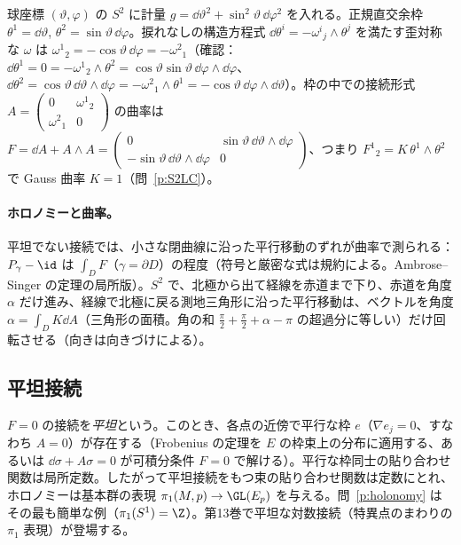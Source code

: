 \begin{ex}\label{ex:S2LC}
球座標 $(\vartheta,\varphi)$ の $S^2$ に計量 $g=\dd\vartheta^2+\sin^2\vartheta\,\dd\varphi^2$ を入れる。正規直交余枠 $\theta^1=\dd\vartheta$, $\theta^2=\sin\vartheta\,\dd\varphi$。捩れなしの構造方程式 $\dd\theta^i=-\omega^i{}_j\wedge\theta^j$ を満たす歪対称な $\omega$ は $\omega^1{}_2=-\cos\vartheta\,\dd\varphi=-\omega^2{}_1$（確認：$\dd\theta^1=0=-\omega^1{}_2\wedge\theta^2=\cos\vartheta\sin\vartheta\,\dd\varphi\wedge\dd\varphi$、$\dd\theta^2=\cos\vartheta\,\dd\vartheta\wedge\dd\varphi=-\omega^2{}_1\wedge\theta^1=-\cos\vartheta\,\dd\varphi\wedge\dd\vartheta$）。枠の中での接続形式 $A=\begin{pmatrix}0&\omega^1{}_2\\\omega^2{}_1&0\end{pmatrix}$ の曲率は
$F=\dd A+A\wedge A=\begin{pmatrix}0&\sin\vartheta\,\dd\vartheta\wedge\dd\varphi\\-\sin\vartheta\,\dd\vartheta\wedge\dd\varphi&0\end{pmatrix}$、つまり $F^1{}_2=K\,\theta^1\wedge\theta^2$ で Gauss 曲率 $K=1$（問~\ref{p:S2LC}）。
\end{ex}
\paragraph{ホロノミーと曲率。}平坦でない接続では、小さな閉曲線に沿った平行移動のずれが曲率で測られる：$P_\gamma-\id$ は $\int_{D}F$（$\gamma=\partial D$）の程度（符号と厳密な式は規約による。Ambrose--Singer の定理の局所版）\tC。$S^2$ で、北極から出て経線を赤道まで下り、赤道を角度 $\alpha$ だけ進み、経線で北極に戻る測地三角形に沿った平行移動は、ベクトルを角度 $\alpha=\int_DK\dd A$（三角形の面積。角の和 $\frac\pi2+\frac\pi2+\alpha-\pi$ の超過分に等しい）だけ回転させる（向きは向きづけによる）\tC。

\subsection{平坦接続}
$F=0$ の接続を\emph{平坦}という。このとき、各点の近傍で平行な枠 $e$（$\nabla e_j=0$、すなわち $A=0$）が存在する（Frobenius の定理を $E$ の枠束上の分布に適用する、あるいは $\dd\sigma+A\sigma=0$ が可積分条件 $F=0$ で解ける）\tC。平行な枠同士の貼り合わせ関数は局所定数。したがって平坦接続をもつ束の貼り合わせ関数は定数にとれ、ホロノミーは基本群の表現 $\pi_1(M,p)\to\GL(E_p)$ を与える。問~\ref{p:holonomy} はその最も簡単な例（$\pi_1(S^1)=\Z$）。第13巻で平坦な対数接続（特異点のまわりの $\pi_1$ 表現）が登場する。

